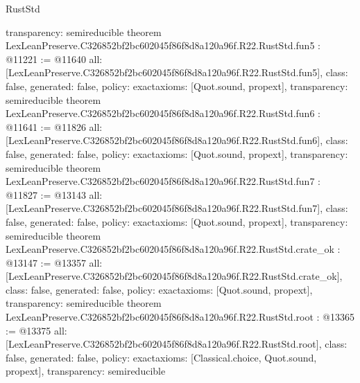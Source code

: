 \begin{lexlean}{RustStd}
\begin{coremodule}
{  transparency: semireducible
}
theorem LexLeanPreserve.C326852bf2bc602045f86f8d8a120a96f.R22.RustStd.fun5 : @11221 := @11640 {
  all: [LexLeanPreserve.C326852bf2bc602045f86f8d8a120a96f.R22.RustStd.fun5],
  class: false,
  generated: false,
  policy: exact{axioms: [Quot.sound, propext]},
  transparency: semireducible
}
theorem LexLeanPreserve.C326852bf2bc602045f86f8d8a120a96f.R22.RustStd.fun6 : @11641 := @11826 {
  all: [LexLeanPreserve.C326852bf2bc602045f86f8d8a120a96f.R22.RustStd.fun6],
  class: false,
  generated: false,
  policy: exact{axioms: [Quot.sound, propext]},
  transparency: semireducible
}
theorem LexLeanPreserve.C326852bf2bc602045f86f8d8a120a96f.R22.RustStd.fun7 : @11827 := @13143 {
  all: [LexLeanPreserve.C326852bf2bc602045f86f8d8a120a96f.R22.RustStd.fun7],
  class: false,
  generated: false,
  policy: exact{axioms: [Quot.sound, propext]},
  transparency: semireducible
}
theorem LexLeanPreserve.C326852bf2bc602045f86f8d8a120a96f.R22.RustStd.crate_ok : @13147 := @13357 {
  all: [LexLeanPreserve.C326852bf2bc602045f86f8d8a120a96f.R22.RustStd.crate_ok],
  class: false,
  generated: false,
  policy: exact{axioms: [Quot.sound, propext]},
  transparency: semireducible
}
theorem LexLeanPreserve.C326852bf2bc602045f86f8d8a120a96f.R22.RustStd.root : @13365 := @13375 {
  all: [LexLeanPreserve.C326852bf2bc602045f86f8d8a120a96f.R22.RustStd.root],
  class: false,
  generated: false,
  policy: exact{axioms: [Classical.choice, Quot.sound, propext]},
  transparency: semireducible
}


\end{coremodule}
\end{lexlean}
